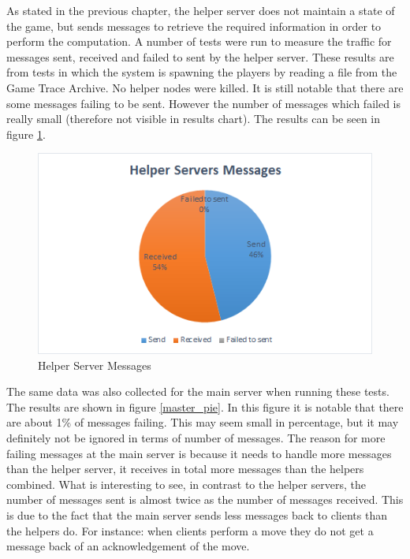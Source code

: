 As stated in the previous chapter, the helper server does not maintain a state of the game, but sends messages to retrieve the required information in order to perform the computation. 
A number of tests were run to measure the traffic for messages sent, received and failed to sent by the helper server.
These results are from tests in which the system is spawning the players by reading a file from the Game Trace Archive.
No helper nodes were killed.
It is still notable that there are some messages failing to be sent. 
However the number of messages which failed is really small (therefore not visible in results chart).
The results can be seen in figure \ref{helper_pie}.


\begin{figure}[ht]
\centering
\includegraphics[scale=0.8]{images/helper_pie.png}
\caption{Helper Server Messages}
\label{helper_pie}
\end{figure}

The same data was also collected for the main server when running these tests.
The results are shown in figure \ref{master_pie}.
In this figure it is notable that there are about 1\% of messages failing.
This may seem small in percentage, but it may definitely not be ignored in terms of number of messages.
The reason for more failing messages at the main server is because it needs to handle more messages than the helper server, it receives in total more messages than the helpers combined.
What is interesting to see, in contrast to the helper servers, the number of messages sent is almost twice as the number of messages received.
This is due to the fact that the main server sends less messages back to clients than the helpers do.
For instance: when clients perform a move they do not get a message back of an acknowledgement of the move.

